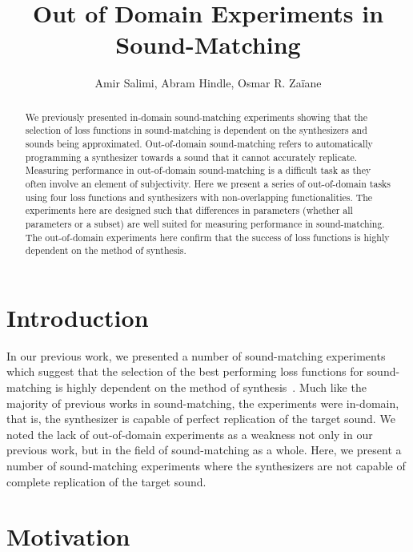 \documentclass{article} %
\title{Out of Domain Experiments in Sound-Matching}
\begin{document}
\author{Amir Salimi, Abram Hindle, Osmar R. Za{\"i}ane}


\maketitle

\begin{abstract}
    We previously presented in-domain sound-matching experiments showing that the selection of loss functions in sound-matching is dependent on the synthesizers and sounds being approximated. Out-of-domain sound-matching refers to automatically programming a synthesizer towards a sound that it cannot accurately replicate. Measuring performance in out-of-domain sound-matching is a difficult task as they often involve an element of subjectivity. Here we present a series of out-of-domain tasks using four loss functions and synthesizers with non-overlapping functionalities. The experiments here are designed such that differences in parameters (whether all parameters or a subset) are well suited for measuring performance in sound-matching. The out-of-domain experiments here confirm that the success of loss functions is highly dependent on the method of synthesis. 
\end{abstract}

\section{Introduction}
In our previous work, we presented a number of sound-matching experiments which suggest that the selection of the best performing loss functions for sound-matching is highly dependent on the method of synthesis~\cite{salimi2025soundmatching}. Much like the majority of previous works in sound-matching, the experiments were in-domain, that is, the synthesizer is capable of perfect replication of the target sound. We noted the lack of out-of-domain experiments as a weakness not only in our previous work, but in the field of sound-matching as a whole. Here, we present a number of sound-matching experiments where the synthesizers are not capable of complete replication of the target sound. 

\section{Motivation}
\end{document}
